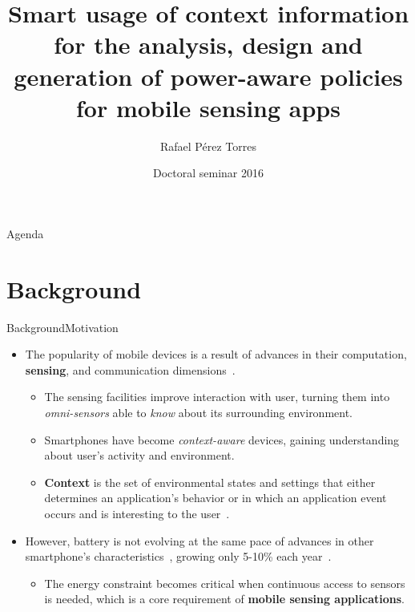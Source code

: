 \documentclass[9pt,xcolor={dvipsnames},handout]{beamer}
\title[Smart usage of context information for the analysis, design and generation of power-aware policies for MSA's]{Smart usage of context information for the analysis, design and generation of power-aware policies for mobile sensing apps}
\date{Doctoral seminar 2016}
\author{
  Rafael Pérez Torres
}
\institute[
  ITL Information Technology Laboratory\\
  Cinvestav\\
  Tamaulipas
] 
{  Dr. César Torres Huitzil\\
  Dr. Hiram Galeana Zapién\\

  LTI Cinvestav
  
}
\begin{document}
{\aauwavesbg%
\begin{frame} %
  \titlepage
\end{frame}}

\begin{frame}{Agenda}{}
\tableofcontents
\end{frame}

\section{Background}
\begin{frame}{Background}{Motivation}
\begin{itemize}
  \item<1-> The popularity of mobile devices is a result of advances in their computation, \textbf{sensing}, and communication dimensions~\cite{Islam2014}.
  \begin{itemize}
    \item<1-> The sensing facilities improve interaction with user, turning them into \emph{omni-sensors} able to \emph{know} about its surrounding environment.
    \item<2-> Smartphones have become \emph{context-aware} devices, gaining understanding about user's activity and environment.
    \item<3-> \textbf{Context} is the set of environmental states and settings that either determines an application's behavior or in which an application event occurs and is interesting to the user~\cite{Chen2000}.
  \end{itemize}
  \item<4-> However, battery is not evolving at the same pace of advances in other smartphone's characteristics~\cite{Kjaergaard2012}, growing only 5-10\% each year~\cite{Ma2012,Evarts2015}.
  \begin{itemize}
    \item The energy constraint becomes critical when continuous access to sensors is needed, which is a core requirement of \textbf{mobile sensing applications}. 
  \end{itemize}
\end{itemize}
\end{frame}
\end{document}
